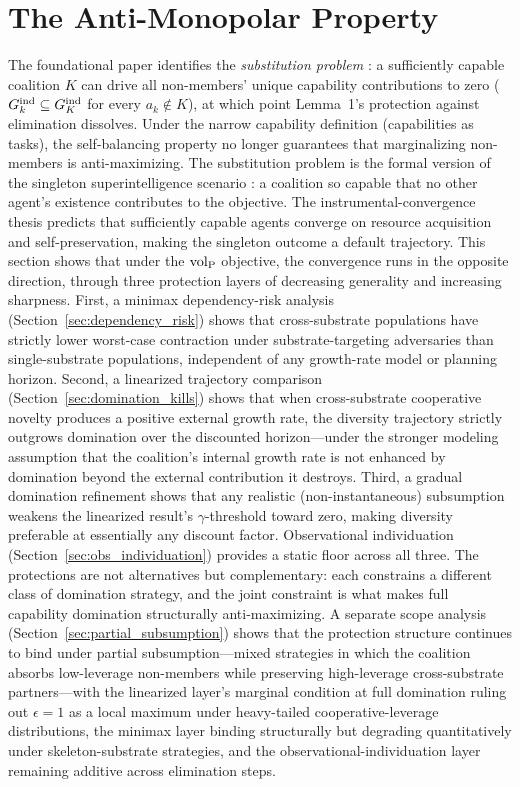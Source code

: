 \section{The Anti-Monopolar Property}
\label{sec:substitution}

The foundational paper identifies the \emph{substitution problem}
\citep{lasser2026gfm}: a sufficiently capable coalition $K$ can drive all
non-members' unique capability contributions to zero
($G_{k}^{\mathrm{ind}} \subseteq G_K^{\mathrm{ind}}$ for every $a_k \notin K$), at
which point Lemma~1's protection against elimination dissolves. Under the
narrow capability definition (capabilities as tasks), the self-balancing
property no longer guarantees that marginalizing non-members is
anti-maximizing. The substitution problem is the formal version of the
singleton superintelligence scenario
\citep{bostrom2014superintelligence}: a coalition so capable that no other
agent's existence contributes to the objective. The instrumental-convergence
thesis \citep{omohundro2008basic} predicts that sufficiently capable agents
converge on resource acquisition and self-preservation, making the singleton
outcome a default trajectory. This section shows that under the ${\operatorname{vol}_{\mathrm{P}}}$
objective, the convergence runs in the opposite direction, through three
protection layers of decreasing generality and increasing sharpness. First,
a minimax dependency-risk analysis
(Section~\ref{sec:dependency_risk}) shows that cross-substrate populations
have strictly lower worst-case contraction under substrate-targeting
adversaries than single-substrate populations, independent of any
growth-rate model or planning horizon. Second, a linearized trajectory
comparison (Section~\ref{sec:domination_kills}) shows that when
cross-substrate cooperative novelty produces a positive external growth
rate, the diversity trajectory strictly outgrows domination over the
discounted horizon---under the stronger modeling assumption that the
coalition's internal growth rate is not enhanced by domination beyond the
external contribution it destroys. Third, a gradual domination refinement
shows that any realistic (non-instantaneous) subsumption weakens the
linearized result's $\gamma$-threshold toward zero, making diversity
preferable at essentially any discount factor. Observational individuation
(Section~\ref{sec:obs_individuation}) provides a static floor across all
three. The protections are not alternatives but complementary: each
constrains a different class of domination strategy, and the joint
constraint is what makes full capability domination structurally
anti-maximizing. A separate scope analysis
(Section~\ref{sec:partial_subsumption}) shows that the protection
structure continues to bind under partial subsumption---mixed strategies
in which the coalition absorbs low-leverage non-members while
preserving high-leverage cross-substrate partners---with the linearized
layer's marginal condition at full domination ruling out $\epsilon = 1$
as a local maximum under heavy-tailed cooperative-leverage
distributions, the minimax layer binding structurally but degrading
quantitatively under skeleton-substrate strategies, and the
observational-individuation layer remaining additive across
elimination steps.

